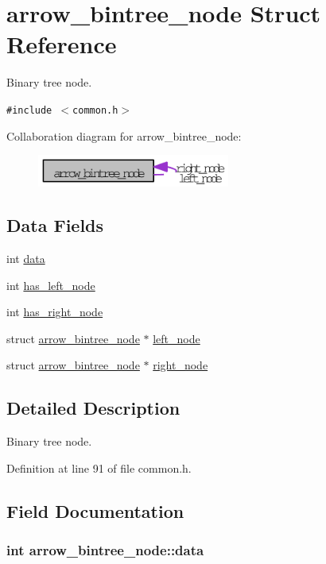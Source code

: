 \hypertarget{structarrow__bintree__node}{
\section{arrow\_\-bintree\_\-node Struct Reference}
\label{structarrow__bintree__node}
}
Binary tree node.  


{\tt \#include $<$common.h$>$}

Collaboration diagram for arrow\_\-bintree\_\-node:\nopagebreak
\begin{figure}[H]
\begin{center}
\leavevmode
\includegraphics[width=179pt]{structarrow__bintree__node__coll__graph}
\end{center}
\end{figure}
\subsection*{Data Fields}
\begin{CompactItemize}
\item 
int \hyperlink{structarrow__bintree__node_de01c6e7aa823db027836d77e7ce48b6}{data}
\item 
int \hyperlink{structarrow__bintree__node_a359d3d029023fb8763af3329207ee53}{has\_\-left\_\-node}
\item 
int \hyperlink{structarrow__bintree__node_f6f8bb35c520a88841a810777e9bc186}{has\_\-right\_\-node}
\item 
struct \hyperlink{structarrow__bintree__node}{arrow\_\-bintree\_\-node} $\ast$ \hyperlink{structarrow__bintree__node_e7eb125cad02704a57796b16c49b2983}{left\_\-node}
\item 
struct \hyperlink{structarrow__bintree__node}{arrow\_\-bintree\_\-node} $\ast$ \hyperlink{structarrow__bintree__node_4875801983f2b0220212951e6c0130af}{right\_\-node}
\end{CompactItemize}


\subsection{Detailed Description}
Binary tree node. 

Definition at line 91 of file common.h.

\subsection{Field Documentation}
\hypertarget{structarrow__bintree__node_de01c6e7aa823db027836d77e7ce48b6}{
\subsubsection[{data}]{\setlength{\rightskip}{0pt plus 5cm}int {\bf arrow\_\-bintree\_\-node::data}}}
\label{structarrow__bintree__node_de01c6e7aa823db027836d77e7ce48b6}


